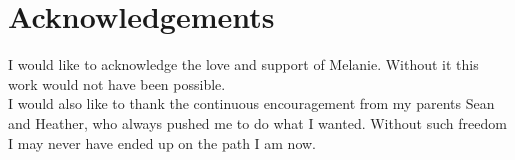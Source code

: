 \chapter{Acknowledgements}

I would like to acknowledge the love and support of Melanie. Without it this work would not have been possible.\\ 

I would also like to thank the continuous encouragement from my parents Sean and Heather, who always pushed me to do what I wanted. Without such freedom I may never have ended up on the path I am now.
